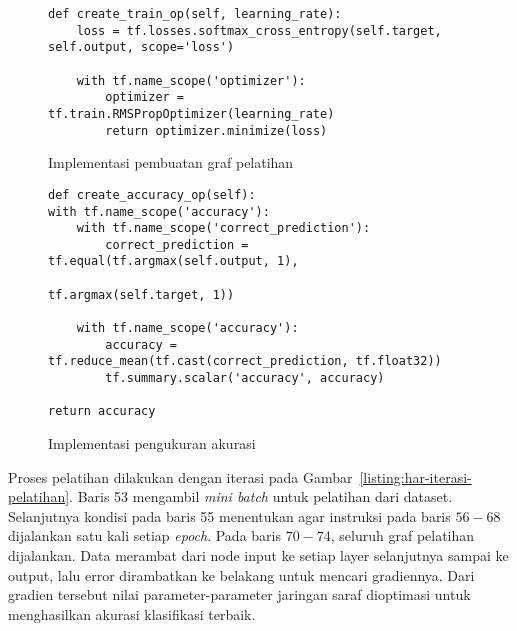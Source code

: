 \begin{figure}[h]
\begin{verbatim}
def create_train_op(self, learning_rate):
    loss = tf.losses.softmax_cross_entropy(self.target, self.output, scope='loss')

    with tf.name_scope('optimizer'):
        optimizer = tf.train.RMSPropOptimizer(learning_rate)
        return optimizer.minimize(loss)
\end{verbatim}
\caption{Implementasi pembuatan graf pelatihan}
\label{listing:har-create-train-op}
\end{figure}

\begin{figure}[h]
\begin{verbatim}
def create_accuracy_op(self):
with tf.name_scope('accuracy'):
    with tf.name_scope('correct_prediction'):
        correct_prediction = tf.equal(tf.argmax(self.output, 1),
                                      tf.argmax(self.target, 1))

    with tf.name_scope('accuracy'):
        accuracy = tf.reduce_mean(tf.cast(correct_prediction, tf.float32))
        tf.summary.scalar('accuracy', accuracy)

return accuracy
\end{verbatim}
\caption{Implementasi pengukuran akurasi}
\label{listing:har-create-accuracy-op}
\end{figure}

Proses pelatihan dilakukan dengan iterasi pada Gambar~\ref{listing:har-iterasi-pelatihan}. Baris 53 mengambil \textit{mini batch} untuk pelatihan dari dataset. Selanjutnya kondisi pada baris 55 menentukan agar instruksi pada baris $56-68$ dijalankan satu kali setiap \textit{epoch}. Pada baris $70-74$, seluruh graf pelatihan dijalankan. Data merambat dari node input ke setiap layer selanjutnya sampai ke output, lalu error dirambatkan ke belakang untuk mencari gradiennya. Dari gradien tersebut nilai parameter-parameter jaringan saraf dioptimasi untuk menghasilkan akurasi klasifikasi terbaik.

